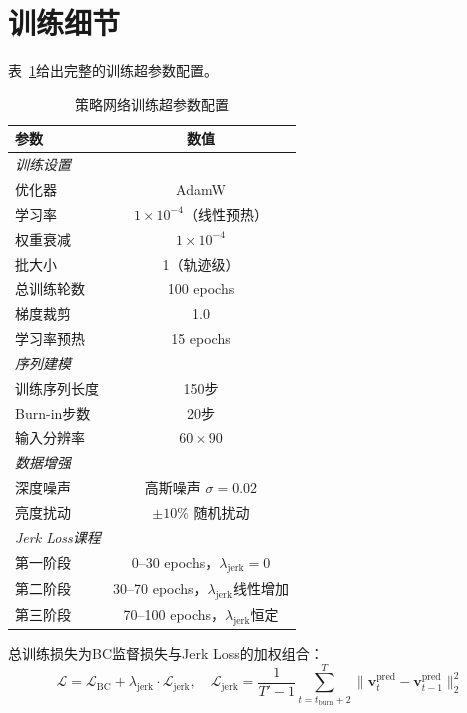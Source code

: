 \section{训练细节}

表~\ref{tab:train_config_ch3}给出完整的训练超参数配置。

\begin{table}[htbp]
\centering
\caption{策略网络训练超参数配置}
\label{tab:train_config_ch3}
\begin{tabular}{lc}
\toprule
\textbf{参数} & \textbf{数值} \\
\midrule
\multicolumn{2}{l}{\textit{训练设置}} \\
\quad 优化器 & AdamW\cite{Loshchilov2019AdamW} \\
\quad 学习率 & $1 \times 10^{-4}$（线性预热） \\
\quad 权重衰减 & $1 \times 10^{-4}$ \\
\quad 批大小 & 1（轨迹级） \\
\quad 总训练轮数 & 100 epochs \\
\quad 梯度裁剪 & 1.0 \\
\quad 学习率预热 & 15 epochs \\
\midrule
\multicolumn{2}{l}{\textit{序列建模}} \\
\quad 训练序列长度 & 150步 \\
\quad Burn-in步数 & 20步 \\
\quad 输入分辨率 & $60 \times 90$ \\
\midrule
\multicolumn{2}{l}{\textit{数据增强}} \\
\quad 深度噪声 & 高斯噪声 $\sigma = 0.02$ \\
\quad 亮度扰动 & $\pm 10\%$ 随机扰动 \\
\midrule
\multicolumn{2}{l}{\textit{Jerk Loss课程}} \\
\quad 第一阶段 & 0--30 epochs，$\lambda_{\text{jerk}}=0$ \\
\quad 第二阶段 & 30--70 epochs，$\lambda_{\text{jerk}}$线性增加 \\
\quad 第三阶段 & 70--100 epochs，$\lambda_{\text{jerk}}$恒定 \\
\bottomrule
\end{tabular}
\end{table}

总训练损失为BC监督损失与Jerk Loss的加权组合：
\begin{equation}
  \mathcal{L} = \mathcal{L}_{\text{BC}} + \lambda_{\text{jerk}} \cdot \mathcal{L}_{\text{jerk}}, \quad
  \mathcal{L}_{\text{jerk}} = \frac{1}{T'-1} \sum_{t=t_{\text{burn}}+2}^{T} \|\mathbf{v}_t^{\text{pred}} - \mathbf{v}_{t-1}^{\text{pred}}\|_2^2
\end{equation}

